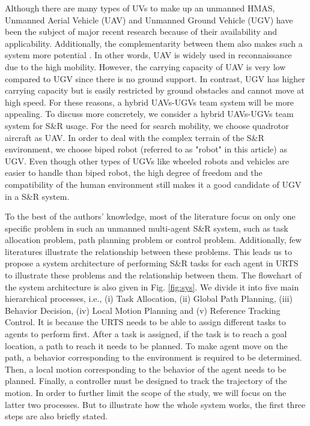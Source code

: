 \documentclass{ieeeaccess}
\begin{document}
Although there are many types of UVs to make up an unmanned HMAS, Unmanned Aerial Vehicle (UAV) and Unmanned Ground Vehicle (UGV) have been the subject of major recent research because of their availability and applicability. Additionally, the complementarity between them also makes such a system more potential \cite{arbanas2018decentralized}. In other words, UAV is widely used in reconnaissance due to the high mobility. However, the carrying capacity of UAV is very low compared to UGV since there is no ground support. In contrast, UGV has higher carrying capacity but is easily restricted by ground obstacles and cannot move at high speed. For these reasons, a hybrid UAVs-UGVs team system will be more appealing. To discuss more concretely, we consider a hybrid UAVs-UGVs team system for S\&R usage. For the need for search mobility, we choose quadrotor aircraft as UAV. In order to deal with the complex terrain of the S\&R environment, we choose biped robot (referred to as "robot" in this article) as UGV. Even though other types of UGVs like wheeled robots and vehicles are easier to handle than biped robot, the high degree of freedom and the compatibility of the human environment still makes it a good candidate of UGV in a S\&R system.

To the best of the authors' knowledge, most of the literature focus on only one specific problem in such an unmanned multi-agent S\&R system, such as task allocation problem, path planning problem or control problem. Additionally, few literatures illustrate the relationship between these problems. This leads us to propose a system architecture of performing S\&R tasks for each agent in URTS to illustrate these problems and the relationship between them. The flowchart of the system architecture is also given in Fig. \ref{fig:sys}. We divide it into five main hierarchical processes, i.e., (i) Task Allocation, (ii) Global Path Planning, (iii) Behavior Decision, (iv) Local Motion Planning and (v) Reference Tracking Control. It is because the URTS needs to be able to assign different tasks to agents to perform first. After a task is assigned, if the task is to reach a goal location, a path to reach it needs to be planned. To make agent move on the path, a behavior corresponding to the environment is required to be determined. Then, a local motion corresponding to the behavior of the agent needs to be planned. Finally, a controller must be designed to track the trajectory of the motion. In order to further limit the scope of the study, we will focus on the latter two processes. But to illustrate how the whole system works, the first three steps are also briefly stated.
\end{document}
